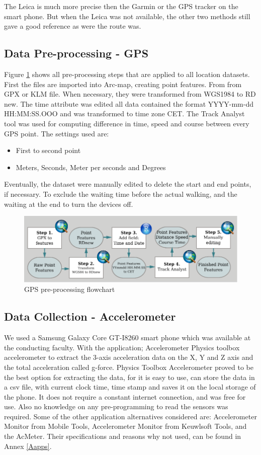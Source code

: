 The Leica is much more precise then the Garmin or the GPS tracker on the smart phone. But when the Leica was not available, the other two methods still gave a good reference as were the route was. 

\subsection{Data Pre-processing - GPS }
Figure \ref{gpspp} shows all pre-processing steps that are applied to all location datasets. First the files are imported into Arc-map, creating point features. From from GPX or KLM file. When necessary, they were transformed from WGS1984 to RD new. The time attribute was edited all data contained the format YYYY-mm-dd HH:MM:SS.OOO and was transformed to time zone CET. The Track Analyst tool was used for computing difference in time, speed and course between every GPS point. The settings used are: 
\begin{itemize}
 \item First to second point
 \item Meters, Seconds, Meter per seconds and Degrees
\end{itemize}
Eventually, the dataset were manually edited to delete the start and end points, if necessary. To exclude the waiting time before the actual walking, and the waiting at the end to turn the devices off. 

\begin{figure}[hb]
\includegraphics[width=\textwidth]{img/M_preprocessingGPS.pdf}
\centering
\caption{GPS pre-processing flowchart}
\label{gpspp}
\end{figure}

\subsection{Data Collection - Accelerometer}
We used a Samsung Galaxy Core GT-I8260 smart phone which was available at the conducting faculty. With the application; Accelerometer Physics toolbox accelerometer to extract the 3-axis acceleration data on the X, Y and Z axis and the total acceleration called g-force. Physics Toolbox Accelerometer proved to be the best option for extracting the data, for it is easy to use, can store the data in a csv file, with current clock time, time stamp and saves it on the local storage of the phone. It does not require a constant internet connection, and was free for use. Also no knowledge on any pre-programming to read the sensors was required. Some of the other application alternatives considered are: Accelerometer Monitor from Mobile Tools, Accelerometer Monitor from Keuwlsoft Tools, and the AcMeter. Their specifications and reasons why not used, can be found in Annex \ref{Aapps}. 

